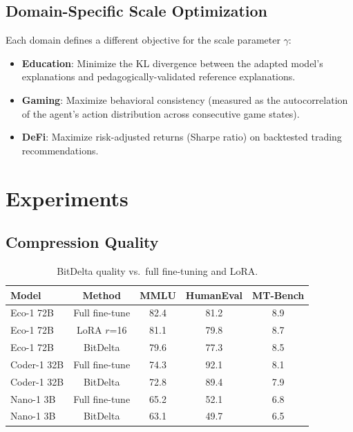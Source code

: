 \documentclass[11pt,letterpaper]{article}
\begin{document}
\subsection{Domain-Specific Scale Optimization}

Each domain defines a different objective for the scale parameter $\gamma$:

\begin{itemize}
    \item \textbf{Education}: Minimize the KL divergence between the adapted model's explanations and pedagogically-validated reference explanations.
    \item \textbf{Gaming}: Maximize behavioral consistency (measured as the autocorrelation of the agent's action distribution across consecutive game states).
    \item \textbf{DeFi}: Maximize risk-adjusted returns (Sharpe ratio) on backtested trading recommendations.
\end{itemize}

\section{Experiments}

\subsection{Compression Quality}

\begin{table}[t]
\centering
\begin{tabular}{lcccc}
\toprule
\textbf{Model} & \textbf{Method} & \textbf{MMLU} & \textbf{HumanEval} & \textbf{MT-Bench} \\
\midrule
Eco-1 72B & Full fine-tune & 82.4 & 81.2 & 8.9 \\
Eco-1 72B & LoRA $r$=16 & 81.1 & 79.8 & 8.7 \\
Eco-1 72B & BitDelta & 79.6 & 77.3 & 8.5 \\
\midrule
Coder-1 32B & Full fine-tune & 74.3 & 92.1 & 8.1 \\
Coder-1 32B & BitDelta & 72.8 & 89.4 & 7.9 \\
\midrule
Nano-1 3B & Full fine-tune & 65.2 & 52.1 & 6.8 \\
Nano-1 3B & BitDelta & 63.1 & 49.7 & 6.5 \\
\bottomrule
\end{tabular}
\caption{BitDelta quality vs.\ full fine-tuning and LoRA.}
\label{tab:quality}
\end{table}
\end{document}
